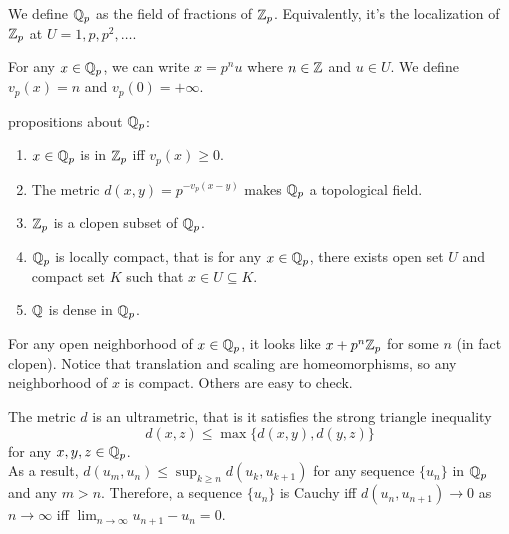 \documentclass[15pt]{scrartcl}
\begin{document}
\begin{definition}
    We define $\mathbb Q_p$ as the field of fractions of $\mathbb Z_p$. Equivalently, it's the localization of $\mathbb Z_p$ at $U={1,p,p^2,\ldots}$. 
    \\
\end{definition}
\begin{definition}
    For any $x\in \mathbb Q_p$, we can write $x=p^n u$ where $n\in \mathbb Z$ and $u\in U$. We define $v_p(x)=n$ and $v_p(0)=+\infty$.
\end{definition}
\begin{proposition}
    propositions about $\mathbb Q_p$:
    \begin{enumerate}
        \item $x\in \mathbb Q_p$ is in $\mathbb Z_p$ iff $v_p(x)\geq 0$.
        \item The metric $d(x,y)=p^{-v_p(x-y)}$ makes $\mathbb Q_p$ a topological field.
        \item $\mathbb Z_p$ is a clopen subset of $\mathbb Q_p$. 
        \item $\mathbb Q_p$ is locally compact, that is for any $x\in \mathbb Q_p$, there exists open set $U$ and compact set $K$ such that $x\in U\subseteq K$.
        \item $\mathbb Q$ is dense in $\mathbb Q_p$.
    \end{enumerate}
\end{proposition}
For any open neighborhood of $x\in \mathbb Q_p$, it looks like $x+p^n\mathbb Z_p$ for some $n$ (in fact clopen). Notice that translation and scaling are homeomorphisms, so any neighborhood of $x$ is compact. Others are easy to check. 
\begin{proposition}
    The metric $d$ is an ultrametric, that is it satisfies the strong triangle inequality
    \[d(x,z)\leq \max\{d(x,y),d(y,z)\}\]
    for any $x,y,z\in \mathbb Q_p$.
    \\

    As a result, $d(u_m,u_n)\leq \sup_{k\geq n} d(u_{k},u_{k+1})$ for any sequence $\{u_n\}$ in $\mathbb Q_p$ and any $m>n$. Therefore, a sequence $\{u_n\}$ is Cauchy iff $d(u_n,u_{n+1})\to 0$ as $n\to \infty$ iff $\lim_{n\to \infty} u_{n+1}-u_n=0$.
\end{proposition}
\end{document}
